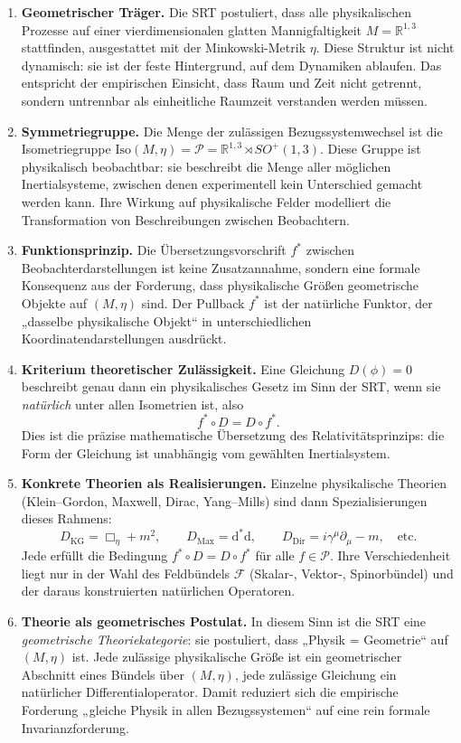 \documentclass[10pt, letterpaper]{article}
\newcommand{\R}{\mathbb{R}}
\begin{document}
\begin{enumerate}
  \item \textbf{Geometrischer Träger.}
  Die SRT postuliert, dass alle physikalischen Prozesse auf einer vierdimensionalen
  glatten Mannigfaltigkeit $M=\R^{1,3}$ stattfinden, ausgestattet mit der 
  Minkowski-Metrik $\eta$. 
  Diese Struktur ist nicht dynamisch: sie ist der feste Hintergrund, 
  auf dem Dynamiken ablaufen. 
  Das entspricht der empirischen Einsicht, dass Raum und Zeit nicht getrennt, 
  sondern untrennbar als einheitliche Raumzeit verstanden werden müssen.

  \item \textbf{Symmetriegruppe.}
  Die Menge der zulässigen Bezugssystemwechsel ist die Isometriegruppe
  $\mathrm{Iso}(M,\eta)=\mathcal P=\R^{1,3}\rtimes SO^+(1,3)$.
  Diese Gruppe ist physikalisch beobachtbar: sie beschreibt die Menge aller möglichen
  Inertialsysteme, zwischen denen experimentell kein Unterschied gemacht werden kann.
  Ihre Wirkung auf physikalische Felder modelliert die Transformation von Beschreibungen
  zwischen Beobachtern.

  \item \textbf{Funktionsprinzip.}
  Die Übersetzungsvorschrift $f^*$ zwischen Beobachterdarstellungen
  ist keine Zusatzannahme, sondern eine formale Konsequenz aus der Forderung,
  dass physikalische Größen geometrische Objekte auf $(M,\eta)$ sind.
  Der Pullback $f^*$ ist der natürliche Funktor, der „dasselbe physikalische Objekt“
  in unterschiedlichen Koordinatendarstellungen ausdrückt.

  \item \textbf{Kriterium theoretischer Zulässigkeit.}
  Eine Gleichung $D(\phi)=0$ beschreibt genau dann ein physikalisches Gesetz im Sinn der SRT,
  wenn sie \emph{natürlich} unter allen Isometrien ist, also
  \[
  f^*\circ D = D\circ f^*.
  \]
  Dies ist die präzise mathematische Übersetzung des Relativitätsprinzips:
  die Form der Gleichung ist unabhängig vom gewählten Inertialsystem.

  \item \textbf{Konkrete Theorien als Realisierungen.}
  Einzelne physikalische Theorien (Klein–Gordon, Maxwell, Dirac, Yang–Mills)
  sind dann Spezialisierungen dieses Rahmens:
  \[
  D_{\text{KG}}=\Box_\eta+m^2,\qquad 
  D_{\text{Max}}=\mathrm{d}^*\mathrm{d},\qquad
  D_{\text{Dir}}=i\gamma^\mu\partial_\mu-m,\quad\text{etc.}
  \]
  Jede erfüllt die Bedingung $f^*\circ D = D\circ f^*$ für alle $f\in\mathcal P$.
  Ihre Verschiedenheit liegt nur in der Wahl des Feldbündels $\mathcal F$
  (Skalar-, Vektor-, Spinorbündel) und der daraus konstruierten natürlichen Operatoren.

  \item \textbf{Theorie als geometrisches Postulat.}
  In diesem Sinn ist die SRT eine \emph{geometrische Theoriekategorie}:
  sie postuliert, dass „Physik = Geometrie“ auf $(M,\eta)$ ist.
  Jede zulässige physikalische Größe ist ein geometrischer Abschnitt eines
  Bündels über $(M,\eta)$, jede zulässige Gleichung ein natürlicher Differentialoperator.
  Damit reduziert sich die empirische Forderung „gleiche Physik in allen Bezugssystemen“
  auf eine rein formale Invarianzforderung.
\end{enumerate}
\end{document}
